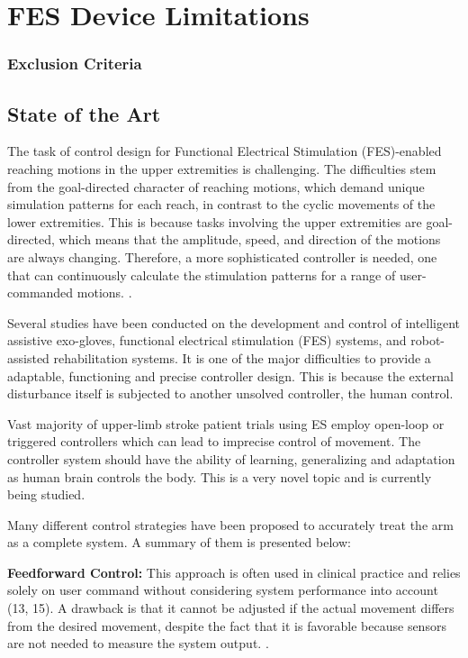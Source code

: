 \newpage
\section{FES Device Limitations}
\subsubsection{Exclusion Criteria}

\subsection{State of the Art}
The task of control design for Functional Electrical Stimulation (FES)-enabled reaching motions in the upper extremities is challenging. The difficulties stem from the goal-directed character of reaching motions, which demand unique simulation patterns for each reach, in contrast to the cyclic movements of the lower extremities. This is because tasks involving the upper extremities are goal-directed, which means that the amplitude, speed, and direction of the motions are always changing. Therefore, a more sophisticated controller is needed, one that can continuously calculate the stimulation patterns for a range of user-commanded motions. \cite{CFF}.

Several studies have been conducted on the development and control of intelligent assistive exo-gloves, functional electrical stimulation (FES) systems, and robot-assisted rehabilitation systems. It is one of the major difficulties to provide a adaptable, functioning and precise controller design. This is because the external disturbance itself is subjected to another unsolved controller, the human control. 

Vast majority of upper-limb stroke patient trials using ES employ open-loop or triggered controllers which can lead to imprecise control of movement. The controller system should have the ability of learning, generalizing and adaptation as human brain controls the body. This is a very novel topic and is currently being studied.

Many different control strategies have been proposed to accurately treat the arm as a complete system. A summary of them is presented below:

\textbf{Feedforward Control:} This approach is often used in clinical practice and relies solely on user command without considering system performance into account (13, 15). A drawback is that it cannot be adjusted if the actual movement differs from the desired movement, despite the fact that it is favorable because sensors are not needed to measure the system output.  \cite{CFF}.

